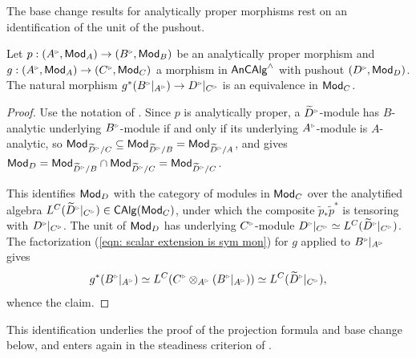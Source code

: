 The base change results for analytically proper morphisms rest on an identification of the unit of the pushout.
\begin{lemma}\label{lem: unit of pushout along proper}
    Let $p:(A^{\tri},\Mod_{A})\to(B^{\tri},\Mod_{B})$ be an analytically proper morphism and $g:(A^{\tri},\Mod_{A})\to(C^{\tri},\Mod_{C})$ a morphism in $\mathsf{An}\mathsf{CAlg}^{\wedge}$ with pushout $(D^{\tri},\Mod_{D})$. The natural morphism $g^{*}(B^{\tri}|_{A^{\tri}})\to D^{\tri}|_{C^{\tri}}$ is an equivalence in $\mathsf{Mod}_{C}$.
\end{lemma}
\begin{proof}
    Use the notation of . Since $p$ is analytically proper, a $\widetilde{D}^{\tri}$-module has $B$-analytic underlying $B^{\tri}$-module if and only if its underlying $A^{\tri}$-module is $A$-analytic, so $\Mod_{\widetilde{D}^{\tri}/C}\subseteq\Mod_{\widetilde{D}^{\tri}/B}=\Mod_{\widetilde{D}^{\tri}/A}$, and  gives $\Mod_{D}=\Mod_{\widetilde{D}^{\tri}/B}\cap\Mod_{\widetilde{D}^{\tri}/C}=\Mod_{\widetilde{D}^{\tri}/C}$. 
    
    This identifies $\mathsf{Mod}_{D}$ with the category of modules in $\mathsf{Mod}_{C}$ over the analytified algebra $L^{C}(\widetilde{D}^{\tri}|_{C^{\tri}})\in\CAlg(\Mod_{C})$, under which the composite $\widetilde{p}_{*}\widetilde{p}^{*}$ is tensoring with $D^{\tri}|_{C^{\tri}}$. The unit of $\mathsf{Mod}_{D}$ has underlying $C^{\tri}$-module $D^{\tri}|_{C^{\tri}}\simeq L^{C}(\widetilde{D}^{\tri}|_{C^{\tri}})$. The factorization (\ref{eqn: scalar extension is sym mon}) for $g$ applied to $B^{\tri}|_{A^{\tri}}$ gives
    $$g^{*}(B^{\tri}|_{A^{\tri}})\simeq L^{C}(C^{\tri}\otimes_{A^{\tri}}(B^{\tri}|_{A^{\tri}}))\simeq L^{C}(\widetilde{D}^{\tri}|_{C^{\tri}}),$$
    whence the claim.
\end{proof}
This identification underlies the proof of the projection formula and base change below, and enters again in the steadiness criterion of .
